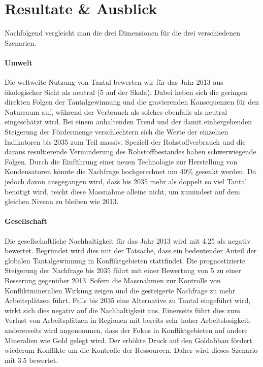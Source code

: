 \section{Resultate \& Ausblick}\label{sec:conflict}

Nachfolgend vergleicht man die drei Dimensionen für die drei verschiedenen Szenarien.

\paragraph{Umwelt}
Die weltweite Nutzung von Tantal bewerten wir für das Jahr 2013 aus ökologischer
Sicht als neutral (5 auf der Skala). Dabei heben sich die geringen direkten
Folgen der Tantalgewinnung und die gravierenden Konsequenzen für den Naturraum
auf, während der Verbrauch als solches ebenfalls als neutral eingeschätzt wird.
Bei einem anhaltenden Trend und der damit einhergehenden Steigerung der
Fördermenge verschlechtern sich die Werte der einzelnen Indikatoren bis 2035 zum
Teil massiv. Speziell der Rohstoffverbrauch und die daraus resultierende
Verminderung des Rohstoffbestandes haben schwerwiegende Folgen. Durch die
Einführung einer neuen Technologie zur Herstellung von Kondensatoren könnte die
Nachfrage hochgerechnet um 40\% gesenkt werden. Da jedoch davon ausgegangen
wird, dass bis 2035 mehr als doppelt so viel Tantal benötigt wird, reicht
diese Massnahme alleine nicht, um zumindest auf dem gleichen Niveau zu bleiben
wie 2013. 

\paragraph{Gesellschaft}
Die gesellschaftliche Nachhaltigkeit für das Jahr 2013 wird mit 4.25 als negativ
bewertet. Begründet wird dies mit der Tatsache, dass ein bedeutender Anteil der
globalen Tantalgewinnung in Konfliktgebieten stattfindet. Die prognostizierte 
Steigerung der Nachfrage bis 2035 führt mit einer Bewertung von 5 zu einer 
Besserung gegenüber 2013. Sofern die Massnahmen zur Kontrolle von Konfliktmineralien 
Wirkung zeigen und die gesteigerte Nachfrage zu mehr Arbeitsplätzen führt. Falls bis
2035 eine Alternative zu Tantal eingeführt wird, wirkt sich dies negativ auf die 
Nachhaltigkeit aus. Einerseits führt dies zum Verlust von Arbeitsplätzen in Regionen
mit bereits sehr hoher Arbeitslosigkeit, andererseits wird angenommen, dass der 
Fokus in Konfliktgebieten auf andere Mineralien wie Gold gelegt wird. Der erhöhte Druck
auf den Goldabbau fördert wiederum Konflikte um die Kontrolle der Ressourcen. Daher 
wird dieses Szenario mit 3.5 bewertet.


